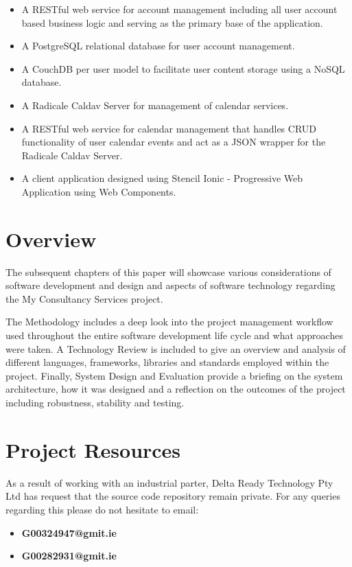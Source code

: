 \begin{itemize}
\item{A RESTful web service for account management including all user account based business logic and serving as the primary base of the application.}

\item{A PostgreSQL\cite{postgres} relational database for user account management.}

\item{A CouchDB\cite{couchdb} per user model to facilitate user content storage using a NoSQL database.}

\item{A Radicale Caldav Server\cite{kozea} for management of calendar services.}

\item{A RESTful web service for calendar management that handles CRUD functionality of user calendar events and act as a JSON wrapper for the Radicale Caldav Server.}

\item{A client application designed using Stencil Ionic - Progressive Web Application using Web Components.}
\end{itemize}

\section{Overview}

The subsequent chapters of this paper will showcase various considerations of software development and design and aspects of software technology regarding the My Consultancy Services project. 

The Methodology includes a deep look into the project management workflow used throughout the entire software development life cycle and what approaches were taken. A Technology Review is included to give an overview and analysis of different languages, frameworks, libraries and standards employed within the project. Finally, System Design and Evaluation provide a briefing on the system architecture, how it was designed and a reflection on the outcomes of the project including robustness, stability and testing. 

\section{Project Resources}

As a result of working with an industrial parter, Delta Ready Technology Pty Ltd has request that the source code repository remain private. For any queries regarding this please do not hesitate to email: \\
\begin{itemize}
\item{\textbf{G00324947@gmit.ie}}
\item{\textbf{G00282931@gmit.ie}}
\end{itemize}

